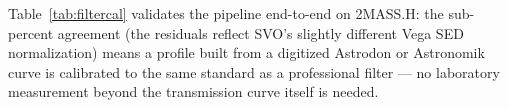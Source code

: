 Table~\ref{tab:filtercal} validates the pipeline end-to-end on 2MASS.H:
the sub-percent agreement (the residuals reflect SVO's slightly different
Vega SED normalization) means a profile built from a digitized Astrodon or
Astronomik curve is calibrated to the same standard as a professional
filter — no laboratory measurement beyond the transmission curve itself is
needed.
